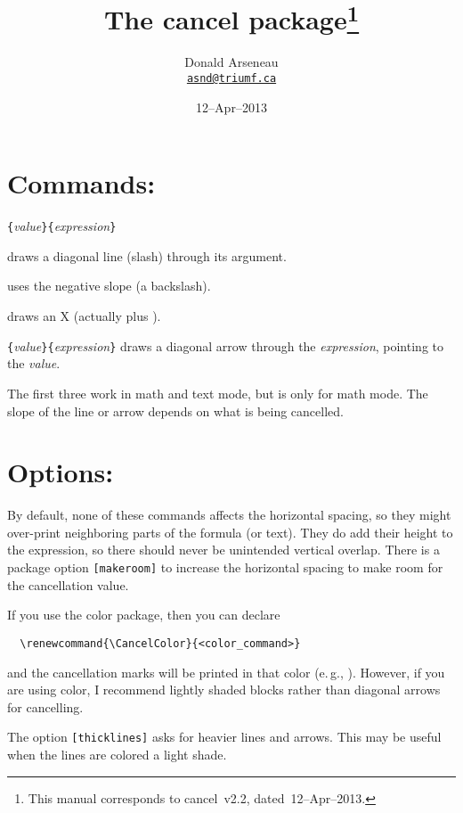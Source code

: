 \documentclass[pagesize=auto]{scrartcl}
\title{The \textsf{cancel} package\thanks{This manual corresponds to \textsf{cancel}~v2.2, dated~12--Apr--2013.}}
\author{Donald Arseneau\\\href{mailto:asnd@triumf.ca}{\texttt{asnd@triumf.ca}}}
\date{12--Apr--2013}
\newcommand*{\meta}[1]{\textlangle\textsl{#1}\textrangle}
\newcommand*{\marg}[1]{\texttt{\{}\meta{#1}\texttt{\}}}
\newcommand*{\cmd}[1]{\texttt{\string#1}}
\begin{document}
\maketitle

\section{Commands:}



\begin{labeling}{\cmd{\cancelto}\marg{value}\marg{expression}}
\item[\cmd{\cancel}] draws a diagonal line (slash) through its argument.
\item[\cmd{\bcancel}] uses the negative slope (a backslash).
\item[\cmd{\xcancel}] draws an X (actually \cmd{\cancel} plus \cmd{\bcancel}).
\item[\cmd{\cancelto}\marg{value}\marg{expression}] draws a diagonal arrow through the \meta{expression}, pointing to the \meta{value}.
\end{labeling}
%
The first three work in math and text mode, but \cmd{\cancelto} is only
for math mode.
The slope of the line or arrow depends on what is being cancelled.  


\section{Options:}

By default, none of these commands affects the horizontal spacing, 
so they might over-print neighboring parts of the formula (or text).
They do add their height to the expression, so there should never be 
unintended vertical overlap.  There is a package option \texttt{[makeroom]} to 
increase the horizontal spacing to make room for the cancellation value.  

If you use the color package, then you can declare
%
\begin{verbatim}
  \renewcommand{\CancelColor}{<color_command>}
\end{verbatim}
%
and the cancellation marks will be printed in that color (e.\,g., \cmd{\blue}).
However, if you are using color, I recommend lightly shaded blocks rather
than diagonal arrows for cancelling.

The option \texttt{[thicklines]} asks for heavier lines and arrows. This may be
useful when the lines are colored a light shade.
\end{document}
